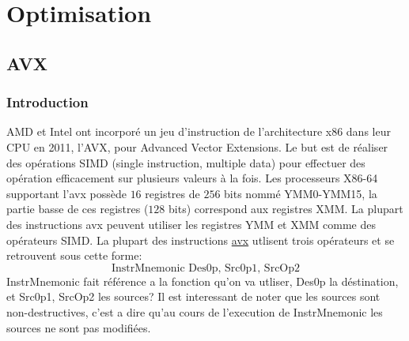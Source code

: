 \documentclass[12pt]{article}
\begin{document}
\section{Optimisation}

\subsection{AVX}

\subsubsection{Introduction}

AMD et Intel ont incorporé un jeu d'instruction de l'architecture x86 dans leur CPU en 2011, l'AVX, pour Advanced Vector Extensions. Le but est de réaliser des opérations SIMD (single instruction, multiple data) pour effectuer des opération efficacement sur plusieurs valeurs à la fois.
\newline
Les processeurs X86-64 supportant l'avx possède $16$ registres de $256$ bits nommé YMM0-YMM15, la partie basse de ces registres ($128$ bits) correspond aux registres XMM. La plupart des instructions avx peuvent utiliser les registres YMM et XMM comme des opérateurs SIMD. La plupart des instructions \url{avx} utlisent trois opérateurs et se retrouvent sous cette forme:
$$ \text{InstrMnemonic Des0p, Src0p1, SrcOp2} $$
InstrMnemonic fait référence a la fonction qu'on va utliser, Des0p la déstination, et Src0p1, SrcOp2 les sources? Il est interessant de noter que les sources sont non-destructives, c'est a dire qu'au cours de l'execution de InstrMnemonic les sources ne sont pas modifiées.
\end{document}
